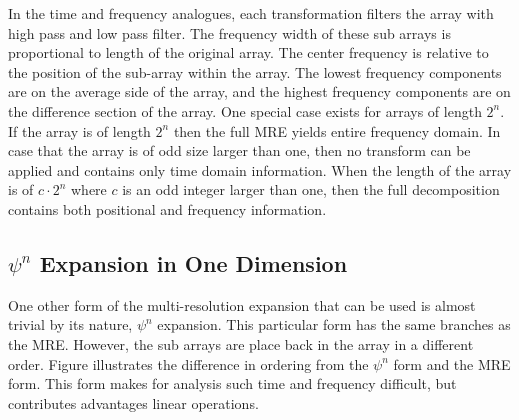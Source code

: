 In the time and frequency analogues, each transformation filters the array with high pass and low pass filter.  The frequency width of these sub arrays is proportional to length of the original array.  The center frequency is relative to the position of the sub-array within the array.   The lowest frequency components are on the average side of the array, and the highest frequency components are on the difference section of the array.  One special case exists for arrays of length $2^n$.  If the array is of length $2^n$ then the full MRE yields entire frequency domain.  In case that the array is of odd size larger than one, then no transform can be applied and contains only time domain information.  When the length of the array is of $c\cdot 2^n$ where $c$ is an odd integer larger than one, then the full decomposition contains both positional and frequency information.  

  
\subsection {$\psi^n$ Expansion in One Dimension}
One other form of the multi-resolution expansion that can be used is almost trivial by its nature, $\psi^n$ expansion.  This particular form has the same branches as the MRE.  However, the sub arrays are place back in the array in a different order.    Figure illustrates the difference in ordering from the $\psi^n$ form and the MRE form.    This form makes for analysis such time and frequency difficult, but contributes advantages linear operations.
